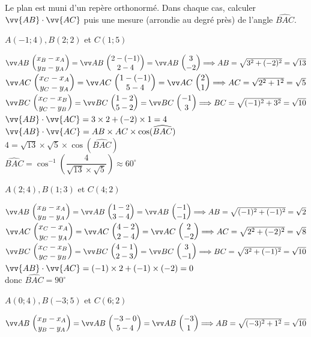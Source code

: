 \documentclass[12pt,a4paper]{article}  %
\begin{document}
\exerciceDS{}
Le plan est muni d'un repère orthonormé. Dans chaque cas, calculer $\vv{A B} \cdot \vv{A C}$ puis une mesure (arrondie au degré près) de l'angle $\widehat{B A C}$.
\begin{enumMet}
    \item $A(-1 ; 4), B(2 ; 2)$ et $C(1 ; 5)$\\
    \begin{corrBox}
        $\Coord{AB}{x_B-x_A}{y_B-y_A}=\Coord{AB}{2-(-1)}{2-4}=\Coord{AB}{3}{-2} \Longrightarrow AB=\sqrt{3^2+(-2)^2}=\sqrt{13}$\\
        $\Coord{AC}{x_C-x_A}{y_C-y_A}=\Coord{AC}{1-(-1)}{5-4}=\Coord{AC}{2}{1} \Longrightarrow AC=\sqrt{2^2+1^2}=\sqrt{5}$\\
        $\Coord{BC}{x_C-x_B}{y_C-y_B}=\Coord{BC}{1-2}{5-2}=\Coord{BC}{-1}{3} \Longrightarrow BC=\sqrt{(-1)^2+3^2}=\sqrt{10}$\\
        $\vv{A B} \cdot \vv{A C}=3\times2+(-2)\times1=4$\\
        $\vv{A B} \cdot \vv{A C}=AB\times AC\times\cos(\widehat{B A C})$\\
        $4=\sqrt{13}\times\sqrt{5}\times\cos(\widehat{B A C})$\\
        $\widehat{B A C}=\cos^{-1}\left(\dfrac{4}{\sqrt{13}\times\sqrt{5}}\right)\approx60^{\circ}$
    \end{corrBox}
    \item $A(2 ; 4), B(1 ; 3)$ et $C(4 ; 2)$\\
    \begin{corrBox}
        $\Coord{AB}{x_B-x_A}{y_B-y_A}=\Coord{AB}{1-2}{3-4}=\Coord{AB}{-1}{-1} \Longrightarrow AB=\sqrt{(-1)^2+(-1)^2}=\sqrt{2}$\\
        $\Coord{AC}{x_C-x_A}{y_C-y_A}=\Coord{AC}{4-2}{2-4}=\Coord{AC}{2}{-2} \Longrightarrow AC=\sqrt{2^2+(-2)^2}=\sqrt{8}$\\
        $\Coord{BC}{x_C-x_B}{y_C-y_B}=\Coord{BC}{4-1}{2-3}=\Coord{BC}{3}{-1} \Longrightarrow BC=\sqrt{3^2+(-1)^2}=\sqrt{10}$\\
        $\vv{A B} \cdot \vv{A C}=(-1)\times2+(-1)\times(-2)=0$\\
        donc $\widehat{B A C}=90^{\circ}$
    \end{corrBox}
    \item $A(0 ; 4), B(-3 ; 5)$ et $C(6 ; 2)$\\
    \begin{corrBox}
        $\Coord{AB}{x_B-x_A}{y_B-y_A}=\Coord{AB}{-3-0}{5-4}=\Coord{AB}{-3}{1} \Longrightarrow AB=\sqrt{(-3)^2+1^2}=\sqrt{10}$\\

\end{corrBox}
\end{enumMet}
\end{document}
